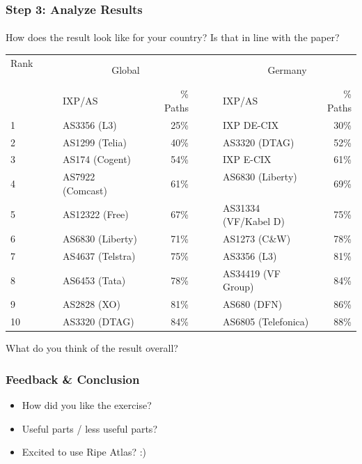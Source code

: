 \clearpage
\begin{frame}
\frametitle{Step 3: Analyze Results}
\framesubtitle{}

How does the result look like for your country? Is that in line with the paper?
\begin{table}[!h]%
	\centering		
	{\begin{tabular}{llrclr}
			\toprule
			Rank ~~~~~& \multicolumn{2}{c}{Global} && \multicolumn{2}{c}{Germany}	\\
			\cmidrule{2-3} \cmidrule{5-6}
			& IXP/AS  & \textSigma\% Paths &~~~& IXP/AS & \textSigma\% Paths   \\
			\midrule
			1 & AS3356 (L3)  & 25\%  && IXP DE-CIX & 30\% \\
			2 & AS1299 (Telia) & 40\%  && AS3320 (DTAG) & 52\% \\
			3 & AS174 (Cogent)  & 54\%  && IXP E-CIX & 61\% \\
			4 & AS7922 (Comcast)~~~  & 61\%  && AS6830 (Liberty) ~~~& 69\% \\
			5 & AS12322 (Free)  & 67\%  && AS31334 (VF/Kabel D) & 75\%\\
			6 & AS6830 (Liberty)  & 71\%  && AS1273 (C\&W)& 78\%\\
			7 & AS4637 (Telstra) & 75\%  && AS3356 (L3)  & 81\% \\
			8 & AS6453 (Tata) & 78\%  && AS34419 (VF Group)& 84\% \\
			9 & AS2828 (XO)  & 81\%  && AS680 (DFN) & 86\% \\
			10 & AS3320 (DTAG) & 84\% && AS6805 (Telefonica) & 88\% \\
			\bottomrule
	\end{tabular}}
\end{table}

\pause
What do you think of the result overall?
\end{frame}
\clearpage

\begin{frame}
\frametitle{Feedback \& Conclusion}
\begin{itemize}
	\item How did you like the exercise?
	\item Useful parts / less useful parts?
	\item Excited to use Ripe Atlas? :)
\end{itemize}
\end{frame}
\clearpage


